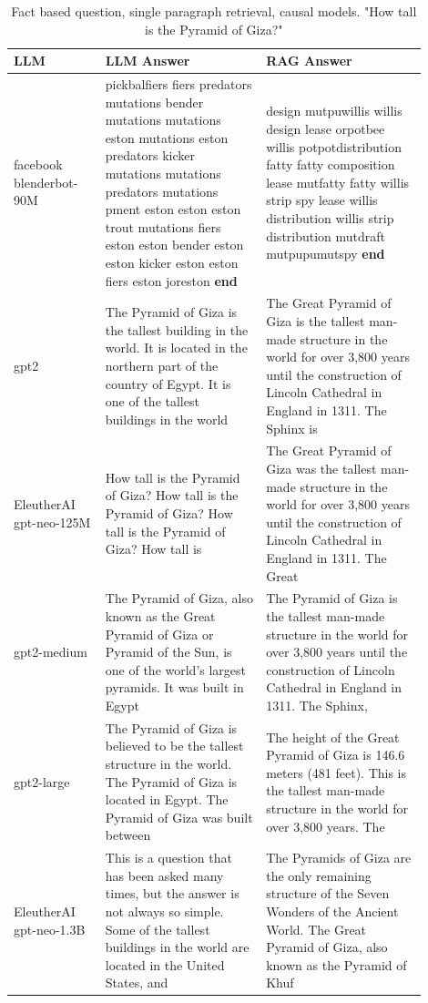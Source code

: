\documentclass{wseas}
\begin{document}
\begin{table}[htbp]
  \centering
  \caption{Fact based question, single paragraph retrieval, causal models. "How tall is the Pyramid of Giza?"} %
  \label{tab:experiment_R_1_paragraph_Q_fact_M_casual_table}  %
  \begin{tabular}{|p{0.20\linewidth}|p{0.35\linewidth}|p{0.35\linewidth}|}
    \hline
    \textbf{LLM} & \textbf{LLM Answer} & \textbf{RAG Answer} \\ \hline
    facebook blenderbot-90M & pickbalfiers fiers predators mutations bender mutations mutations eston mutations eston predators kicker mutations mutations predators mutations pment eston eston eston trout mutations fiers eston eston bender eston eston kicker eston eston fiers eston joreston \textbf{end} & design mutpuwillis willis design lease orpotbee willis potpotdistribution fatty fatty composition lease mutfatty fatty willis strip spy lease willis distribution willis strip distribution mutdraft mutpupumutspy \textbf{end} \\ \hline
    gpt2 & The Pyramid of Giza is the tallest building in the world. It is located in the northern part of the country of Egypt. It is one of the tallest buildings in the world & The Great Pyramid of Giza is the tallest man-made structure in the world for over 3,800 years until the construction of Lincoln Cathedral in England in 1311. The Sphinx is \\ \hline
    EleutherAI gpt-neo-125M & How tall is the Pyramid of Giza? How tall is the Pyramid of Giza? How tall is the Pyramid of Giza? How tall is & The Great Pyramid of Giza was the tallest man-made structure in the world for over 3,800 years until the construction of Lincoln Cathedral in England in 1311. The Great \\ \hline
    gpt2-medium & The Pyramid of Giza, also known as the Great Pyramid of Giza or Pyramid of the Sun, is one of the world's largest pyramids. It was built in Egypt & The Pyramid of Giza is the tallest man-made structure in the world for over 3,800 years until the construction of Lincoln Cathedral in England in 1311. The Sphinx, \\ \hline
    gpt2-large & The Pyramid of Giza is believed to be the tallest structure in the world. The Pyramid of Giza is located in Egypt. The Pyramid of Giza was built between & The height of the Great Pyramid of Giza is 146.6 meters (481 feet). This is the tallest man-made structure in the world for over 3,800 years. The \\ \hline
    EleutherAI gpt-neo-1.3B & This is a question that has been asked many times, but the answer is not always so simple. Some of the tallest buildings in the world are located in the United States, and & The Pyramids of Giza are the only remaining structure of the Seven Wonders of the Ancient World. The Great Pyramid of Giza, also known as the Pyramid of Khuf \\ \hline
  \end{tabular}
\end{table}
\end{document}
